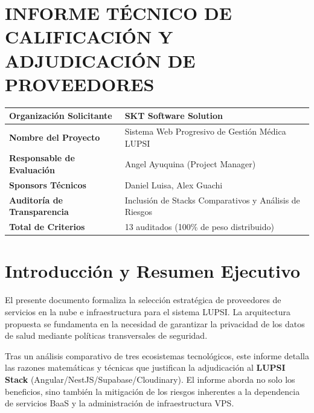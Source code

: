 \documentclass[a4paper,12pt]{article}
\renewcommand{\arraystretch}{1.1}
\begin{document}
\raggedbottom

\section*{INFORME TÉCNICO DE CALIFICACIÓN Y ADJUDICACIÓN DE PROVEEDORES}

\begin{table}[H]
\centering
\small
\renewcommand{\arraystretch}{1.2}
\begin{tabularx}{\linewidth}{|X|p{10cm}|}
\hline
\rowcolor{SKTLight} \textbf{Organización Solicitante} & SKT Software Solution \\ \hline
\textbf{Nombre del Proyecto} & Sistema Web Progresivo de Gestión Médica LUPSI \\ \hline
\textbf{Responsable de Evaluación} & Angel Ayuquina (Project Manager) \\ \hline
\textbf{Sponsors Técnicos} & Daniel Luisa, Alex Guachi \\ \hline
\textbf{Auditoría de Transparencia} & Inclusión de Stacks Comparativos y Análisis de Riesgos \\ \hline
\textbf{Total de Criterios} & 13 auditados (100\% de peso distribuido) \\ \hline
\end{tabularx}
\end{table}

\section{Introducción y Resumen Ejecutivo}
El presente documento formaliza la selección estratégica de proveedores de servicios en la nube e infraestructura para el sistema LUPSI. La arquitectura propuesta se fundamenta en la necesidad de garantizar la privacidad de los datos de salud mediante políticas transversales de seguridad. 

Tras un análisis comparativo de tres ecosistemas tecnológicos, este informe detalla las razones matemáticas y técnicas que justifican la adjudicación al \textbf{LUPSI Stack} (Angular/NestJS/Supabase/Cloudinary). El informe aborda no solo los beneficios, sino también la mitigación de los riesgos inherentes a la dependencia de servicios BaaS y la administración de infraestructura VPS.

\end{document}
